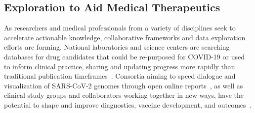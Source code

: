 \subsection*{Exploration to Aid Medical Therapeutics}
As researchers and medical professionals from a variety of disciplines seek to accelerate actionable knowledge, collaborative frameworks and data exploration efforts are forming. National laboratories and science centers are searching databases for drug candidates that could be re-purposed for COVID-19 or used to inform clinical practice, sharing and updating progress more rapidly than traditional publication timeframes~\cite{Smith2020, Chen2020.04.17.047548}. Consortia aiming to speed dialogue and visualization of SARS-CoV-2 genomes through open online reports~\cite{nextstrain}, as well as clinical study groups and collaborators working together in new ways, have the potential to shape and improve diagnostics, vaccine development, and outcomes~\cite{schneider2019rethinking, kaggle}. 